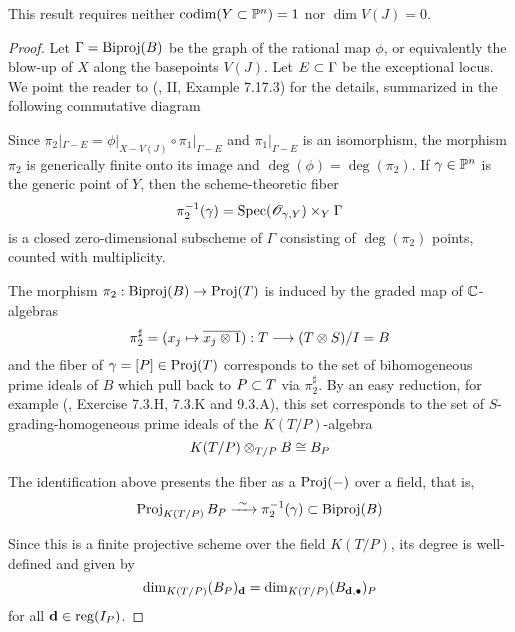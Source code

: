 \documentclass[fleqn,reqno]{amsart}
\begin{document}
\begin{remarkhint}
This result requires neither $\operatorname{codim}(Y\subset\mathbb{P}^n)=1$ nor $\dim V(J)=0$.
\end{remarkhint}

\begin{proof}
Let $\Gamma=\operatorname{Biproj}(B)$ be the graph of the rational map $\phi$, or equivalently
the blow-up of $X$ along the basepoints $V(J)$. Let $E\subset\Gamma$ be the exceptional
locus.
We point the reader to (\citet{Har77}, II, Example 7.17.3) for the details,
summarized in the following commutative diagram


Since $\pi_2|_{\Gamma-E}=\phi|_{X-V(J)}\circ\pi_1|_{\Gamma-E}$ and
$\pi_1|_{\Gamma-E}$ is an isomorphism,
the morphism $\pi_2$ is generically finite onto its image and $\deg(\phi)=\deg(\pi_2)$.
If $\gamma\in\mathbb{P}^n$ is the generic point of $Y$, then the scheme-theoretic fiber
\[
	\pi_2^{-1}(\gamma)=\operatorname{Spec}(\mathscr{O}_{\gamma,Y})\times_Y \Gamma
\]
is a closed zero-dimensional subscheme of $\Gamma$ consisting of
$\deg(\pi_2)$ points, counted with multiplicity.

The morphism $\pi_2:\operatorname{Biproj}(B)\to\operatorname{Proj}(T)$ is induced by the graded map of $\mathbb{C}$-algebras
\[
	\pi_2^\sharp=(x_j\mapsto \overline{x_j\otimes1}):T\longrightarrow{(T\otimes S)}/{I}=B
\]
and the fiber of $\gamma=[P]\in\operatorname{Proj} (T)$ corresponds to the set of
bihomogeneous prime ideals of $B$
which pull back to $P\subset T$ via $\pi_2^\sharp$.
By an easy reduction,
for example (\citet{Vak10}, Exercise 7.3.H, 7.3.K and 9.3.A),
this set corresponds to the set of $S$-grading-homogeneous prime ideals of the $K(T/P)$-algebra
\[
	K(T/P)\otimes_{T/P}B\cong B_P
\]

The identification above presents the fiber as a $\operatorname{Proj}(-)$ over a field,
that is,
\[
	\operatorname{Proj}_{K(T/P)} B_P\xrightarrow{~\sim~}\pi_2^{-1}(\gamma)\subset\operatorname{Biproj}(B)
\]

Since this is a finite projective scheme over the field $K(T/P)$,
its degree is well-defined and given by
\[
	\dim_{K(T/P)} (B_P)_\mathbf d=\dim_{K(T/P)} (B_{\mathbf d,\bullet})_P
\]
for all $\mathbf d\in\operatorname{reg}(I_P)$.
\end{proof}
\end{document}
